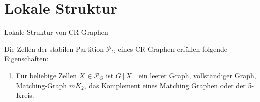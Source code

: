 \documentclass{beamer}
\begin{document}
	\section{Lokale Struktur}
	\begin{frame}{Lokale Struktur von CR-Graphen}
		\begin{Lemma}
			Die Zellen der stabilen Partition $\mathcal{P}_G$ eines CR-Graphen erfüllen folgende Eigenschaften:
			
			\begin{enumerate}[label=(\Alph*)]
				\item Für beliebige Zellen $X\in \mathcal{P}_G$ ist $G[X]$ ein \alert{leerer Graph}, \alert{vollständiger Graph}, \alert{Matching-Graph} $mK_2$, das \alert{Komplement eines Matching Graphen} oder der \alert{5-Kreis}.
			\end{enumerate}
		\end{Lemma}
	\end{frame}
\end{document}
